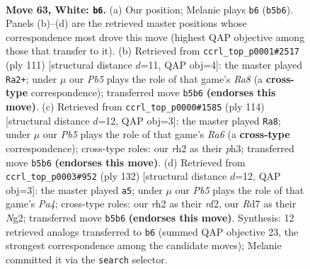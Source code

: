 \documentclass[11pt]{article}
\begin{document}
\clearpage

\begin{figure}[p]\centering
\begin{subfigure}{0.46\textwidth}\centering
\resizebox{\linewidth}{!}{%
\newchessgame
\chessboard[
  setfen={8/3R4/8/1P4k1/P5n1/1K6/7r/8 w - - 12 63},
  showmover=false,
  pgfstyle=straightmove, color=movearrow, markmove={b5-b6}
]}
\caption{}
\end{subfigure}\hfill
\begin{subfigure}{0.46\textwidth}\centering
\resizebox{\linewidth}{!}{%
\newchessgame
\chessboard[
  setfen={8/8/8/p1k5/5R2/8/3KN3/r7 b - - 5 56},
  showmover=false,
  pgfstyle=straightmove, color=movearrow, markmove={a1-a2}
]}
\caption{}
\end{subfigure}
\\[4pt]
\begin{subfigure}{0.46\textwidth}\centering
\resizebox{\linewidth}{!}{%
\newchessgame
\chessboard[
  setfen={8/8/R7/6nk/8/1P5p/2K5/8 w - - 2 58},
  showmover=false,
  pgfstyle=straightmove, color=movearrow, markmove={a6-a8}
]}
\caption{}
\end{subfigure}\hfill
\begin{subfigure}{0.46\textwidth}\centering
\resizebox{\linewidth}{!}{%
\newchessgame
\chessboard[
  setfen={8/4n3/4k3/8/P1KP4/8/5nN1/8 w - - 0 67},
  showmover=false,
  pgfstyle=straightmove, color=movearrow, markmove={a4-a5}
]}
\caption{}
\end{subfigure}
\caption{\textbf{Move 63, White: \texttt{b6}.} (a) Our position; Melanie plays \texttt{b6} (\texttt{b5b6}). Panels (b)--(d) are the retrieved master positions whose correspondence most drove this move (highest QAP objective among those that transfer to it). (b) Retrieved from \texttt{ccrl\_top\_p0001\#2517} (ply 111) [structural distance $d$=11, QAP obj=4]: the master played \texttt{Ra2+}; under $\mu$ our \emph{Pb5} plays the role of that game's \emph{Ra8} (a \textbf{cross-type} correspondence); transferred move \texttt{b5b6} \textbf{(endorses this move)}. (c) Retrieved from \texttt{ccrl\_top\_p0000\#1585} (ply 114) [structural distance $d$=12, QAP obj=3]: the master played \texttt{Ra8}; under $\mu$ our \emph{Pb5} plays the role of that game's \emph{Ra6} (a \textbf{cross-type} correspondence); cross-type roles: our \emph{r}h2 as their \emph{p}h3; transferred move \texttt{b5b6} \textbf{(endorses this move)}. (d) Retrieved from \texttt{ccrl\_top\_p0003\#952} (ply 132) [structural distance $d$=12, QAP obj=3]: the master played \texttt{a5}; under $\mu$ our \emph{Pb5} plays the role of that game's \emph{Pa4}; cross-type roles: our \emph{r}h2 as their \emph{n}f2, our \emph{R}d7 as their \emph{N}g2; transferred move \texttt{b5b6} \textbf{(endorses this move)}. Synthesis: 12 retrieved analogs transferred to \texttt{b6} (summed QAP objective 23, the strongest correspondence among the candidate moves); Melanie committed it via the \texttt{search} selector.}
\label{fig:thought-m124}
\end{figure}
\end{document}
